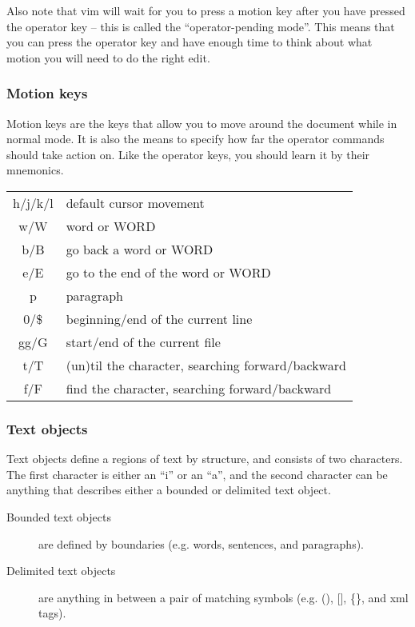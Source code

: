 Also note that vim will wait for you to press a motion key after you have pressed the operator key -- this is called the ``operator-pending mode''.
This means that you can press the operator key and have enough time to think about what motion you will need to do the right edit.

\subsubsection{Motion keys}

Motion keys are the keys that allow you to move around the document while in normal mode.
It is also the means to specify how far the operator commands should take action on.
Like the operator keys, you should learn it by their mnemonics.
\newline

\begin{tabular}[c]{c|l}
    h/j/k/l & default cursor movement\\
    w/W     & word or WORD\\
    b/B     & go back a word or WORD\\
    e/E     & go to the end of the word or WORD\\
    p       & paragraph\\
    0/\$    & beginning/end of the current line\\
    gg/G    & start/end of the current file\\
    t/T     & (un)til the character, searching forward/backward\\
    f/F     & find the character, searching forward/backward\\
\end{tabular}

\subsubsection{Text objects}

Text objects define a regions of text by structure, and consists of two characters.
The first character is either an ``i'' or an ``a'', and the second character can be anything that describes either a bounded or delimited text object.

\begin{description}
    \item [Bounded text objects] are defined by boundaries (e.g. words, sentences, and paragraphs).
    \item [Delimited text objects] are anything in between a pair of matching symbols (e.g. (), [], \{\}, and xml tags).
\end{description}

